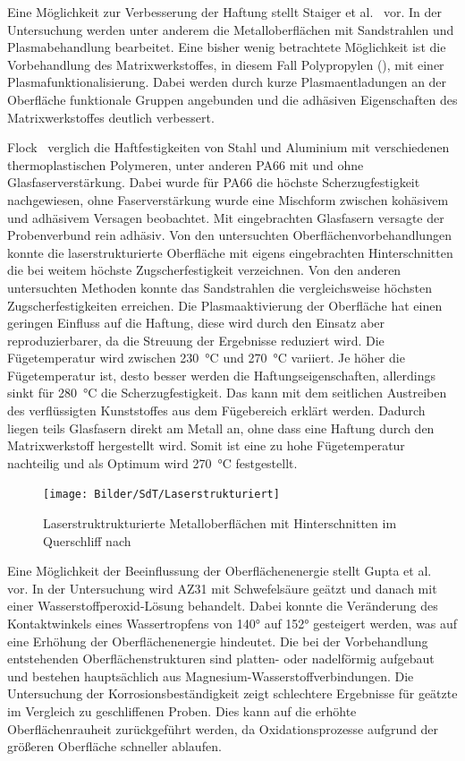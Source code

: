 Eine Möglichkeit zur Verbesserung der Haftung stellt Staiger et al.~\cite{Staiger2014} vor.
In der Untersuchung werden unter anderem die Metalloberflächen mit Sandstrahlen und Plasmabehandlung bearbeitet.
Eine bisher wenig betrachtete Möglichkeit ist die Vorbehandlung des Matrixwerkstoffes, in diesem Fall Polypropylen (), mit einer Plasmafunktionalisierung.
Dabei werden durch kurze Plasmaentladungen an der Oberfläche funktionale Gruppen angebunden und die adhäsiven Eigenschaften des Matrixwerkstoffes deutlich verbessert.

Flock~\cite{Flock2012} verglich die Haftfestigkeiten von Stahl und Aluminium mit verschiedenen thermoplastischen Polymeren, unter anderen PA66 mit und ohne Glasfaserverstärkung.
Dabei wurde für PA66 die höchste Scherzugfestigkeit nachgewiesen, ohne Faserverstärkung wurde eine Mischform zwischen kohäsivem und adhäsivem Versagen beobachtet.
Mit eingebrachten Glasfasern versagte der Probenverbund rein adhäsiv.
Von den untersuchten Oberflächenvorbehandlungen konnte die laserstrukturierte Oberfläche mit eigens eingebrachten Hinterschnitten die bei weitem höchste Zugscherfestigkeit verzeichnen.
Von den anderen untersuchten Methoden konnte das Sandstrahlen die vergleichsweise höchsten Zugscherfestigkeiten erreichen.
Die Plasmaaktivierung der Oberfläche hat einen geringen Einfluss auf die Haftung, diese wird durch den Einsatz aber reproduzierbarer, da die Streuung der Ergebnisse reduziert wird.
Die Fügetemperatur wird zwischen \SI{230}{\degreeCelsius} und \SI{270}{\degreeCelsius} variiert.
Je höher die Fügetemperatur ist, desto besser werden die Haftungseigenschaften, allerdings sinkt für \SI{280}{\degreeCelsius} die Scherzugfestigkeit.
Das kann mit dem seitlichen Austreiben des verflüssigten Kunststoffes aus dem Fügebereich erklärt werden.
Dadurch liegen teils Glasfasern direkt am Metall an, ohne dass eine Haftung durch den Matrixwerkstoff hergestellt wird.
Somit ist eine zu hohe Fügetemperatur nachteilig und als Optimum wird \SI{270}{\degreeCelsius} festgestellt.

\begin{figure}[H]%
    \centering
    \texttt{[image: Bilder/SdT/Laserstrukturiert]}
    \caption[Querschliff laserstrukturierter Metalloberflächen]{Laserstruktrukturierte Metalloberflächen mit Hinterschnitten im Querschliff nach \cite{Flock2012}}
    \label{fig:laser}
\end{figure}

Eine Möglichkeit der Beeinflussung der Oberflächenenergie stellt Gupta et al.~\cite{Gupta2012} vor.
In der Untersuchung wird AZ31 mit Schwefelsäure geätzt und danach mit einer Wasserstoffperoxid-Lösung behandelt.
Dabei konnte die Veränderung des Kontaktwinkels eines Wassertropfens von \ang{140} auf \ang{152} gesteigert werden, was auf eine Erhöhung der Oberflächenenergie hindeutet.
Die bei der Vorbehandlung entstehenden Oberflächenstrukturen sind platten- oder nadelförmig aufgebaut und bestehen hauptsächlich aus Magnesium-Wasserstoffverbindungen.
Die Untersuchung der Korrosionsbeständigkeit zeigt schlechtere Ergebnisse für geätzte im Vergleich zu geschliffenen Proben.
Dies kann auf die erhöhte Oberflächenrauheit zurückgeführt werden, da Oxidationsprozesse aufgrund der größeren Oberfläche schneller ablaufen.


